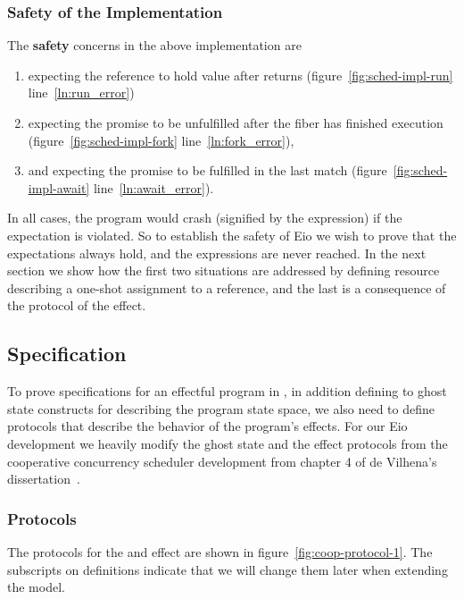 \subsubsection{Safety of the Implementation}
The \textbf{safety} concerns in the above implementation are
\begin{enumerate}
  \item {} expecting the  reference to hold  value after  returns (figure~\ref{fig:sched-impl-run} line~\ref{ln:run_error})
  \item {} expecting the promise to be unfulfilled after the fiber has finished execution (figure~\ref{fig:sched-impl-fork} line~\ref{ln:fork_error}),
  \item and  expecting the promise to be fulfilled in the last match (figure~\ref{fig:sched-impl-await} line~\ref{ln:await_error}).
\end{enumerate}
In all cases, the program would crash (signified by the  expression) if the expectation is violated.
So to establish the safety of Eio we wish to prove that the expectations always hold, and the  expressions are never reached.
In the next section we show how the first two situations are addressed by defining resource describing a one-shot assignment to a reference, and the last is a consequence of the protocol of the \esuspend{} effect.

\subsection{Specification}
\label{sec:sched-spec}

To prove specifications for an effectful program in \hazel{}, in addition defining to ghost state constructs for describing the program state space, we also need to define protocols that describe the behavior of the program's effects.
For our Eio development we heavily modify the ghost state and the effect protocols from the cooperative concurrency scheduler development from chapter 4 of de Vilhena's dissertation~\cite{de2022proof}.

\subsubsection{Protocols}
\label{sec:sched-spec-protocols}

The protocols for the \efork{} and \esuspend{} effect are shown in figure~\ref{fig:coop-protocol-1}.
The subscripts on definitions indicate that we will change them later when extending the model.

